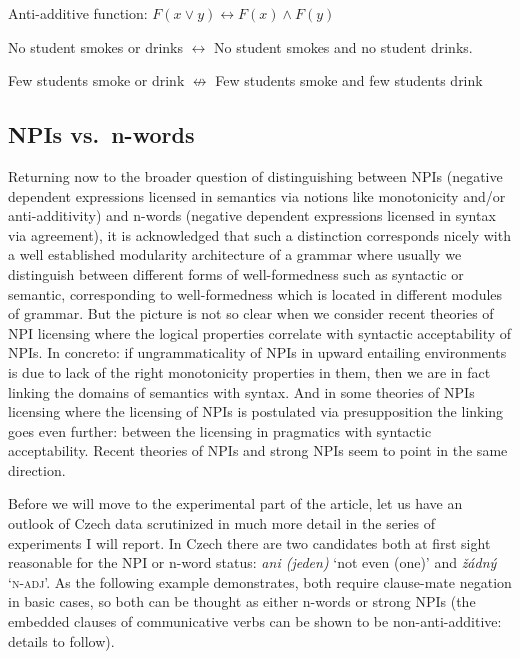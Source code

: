 \documentclass[output=paper,
]{langscibook}
\begin{document}
\ea\label{ex-19} Anti-additive function: $F(x \vee y) \leftrightarrow F(x) \wedge F(y)$
\z

\ea\label{ex-20} No student smokes or drinks $\leftrightarrow$ No student smokes and no student drinks.
\z

\ea\label{ex-21} Few students smoke or drink $\not\leftrightarrow$ Few students smoke and few students drink \label{ex:few}
\z


\subsection{NPIs vs.~n-words}\label{npis-vs.n-words-modularity}

Returning now to the broader question of distinguishing between NPIs (negative dependent expressions licensed in semantics via notions like monotonicity and/or anti-additivity) and n-words (negative dependent expressions licensed in syntax via agreement), it is acknowledged that such a distinction corresponds nicely with a well established modularity architecture of a grammar where usually we  distinguish between different forms of well-formedness such as syntactic or semantic, corresponding to well-formedness which is located in different modules of grammar. But the picture is not so clear when we consider recent theories of NPI licensing where the  logical properties correlate with syntactic acceptability of NPIs. In concreto: if ungrammaticality of NPIs in upward entailing environments is due to lack of the right monotonicity properties in them, then we are in fact linking the domains of semantics with syntax. And in some theories \citep{heim1984note,crnivc2014against} of NPIs licensing where the licensing of NPIs is postulated via presupposition the linking goes even further: between the licensing in pragmatics with syntactic acceptability. Recent theories of NPIs \citep{chierchia2013logic} and strong NPIs \citep{gajewski2011licensing} seem to point in the same direction.

Before we will move to the experimental part of the article, let us have an outlook of Czech data scrutinized in much more detail in the series of experiments I will report. In Czech there are two candidates both at first sight reasonable for the NPI or n-word status: \textit{ani (jeden)} `not even (one)' and \textit{žádný} `\textsc{n-adj}'. As the following example demonstrates, both require clause-mate negation in basic cases, so both can be thought as either n-words or strong NPIs (the embedded clauses of communicative verbs can be shown to be non-anti-additive: details to follow).
\end{document}
